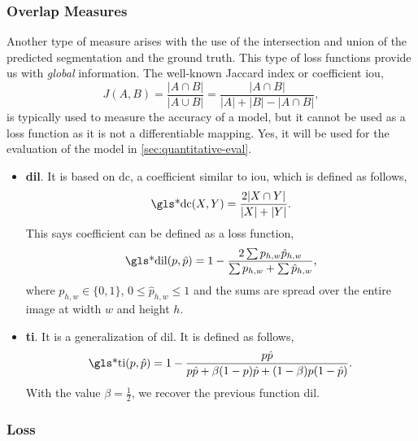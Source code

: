 \subsubsection{Overlap Measures}

Another type of measure arises with the use of the intersection and union of
the predicted segmentation and the ground truth. This type of loss functions
provide us with \emph{global} information. The well-known Jaccard index or
coefficient \gls{iou},
\begin{equation}
  J(A,B) = \frac{|A \cap B|}{|A \cup B|} =
  \frac{|A \cap B|}{|A| + |B| - |A \cap B|},
\end{equation}
is typically used to measure the accuracy of a model, but it cannot be used as
a loss function as it is not a differentiable mapping. Yes, it will be used for
the evaluation of the model in \vref{sec:quantitative-eval}.

\begin{itemize}
  \item \textbf{\gls*{dil}}. It is based on \gls{dc}, a coefficient similar to
  \gls{iou}, which is defined as follows,
  \begin{equation}
    \text{\gls*{dc}}(X, Y) = \frac{2|X \cap Y|}{|X| + |Y|}.
  \end{equation}
  This says coefficient can be defined as a loss function,
  \begin{equation}
    \text{\gls*{dil}}(p, \hat{p}) = 1 -
    \frac{2\sum p_{h, w}\hat{p}_{h, w}}{\sum p_{h, w} + \sum \hat{p}_{h, w}},
  \end{equation}
  where \(p_{h, w} \in \{0, 1\}\), \(0 \leq \hat{p}_{h, w} \leq 1\) and the
  sums are spread over the entire image at width \(w\) and height \(h\).
  \item \textbf{\gls*{ti}}. It is a generalization of \gls{dil}. It is defined
  as follows,
  \begin{equation}
    \text{\gls*{ti}}(p, \hat{p}) = 1 -
    \frac{p\hat{p}}{p\hat{p} + \beta(1 - p)\hat{p} + (1 - \beta)p(1 - \hat{p})}.
  \end{equation}
  With the value \(\beta = \frac{1}{2}\), we recover the previous function
  \gls{dil}.
\end{itemize}

\subsubsection{ Loss}

